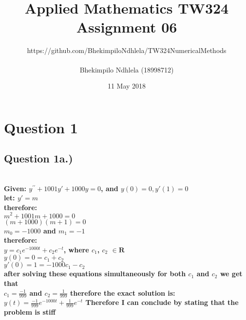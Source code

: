 \documentclass{article}
\title{Applied Mathematics TW324 Assignment 06}
\author{https://github.com/BhekimpiloNdhlela/TW324NumericalMethods \\ \\ Bhekimpilo Ndhlela (18998712)}
\date{11 May 2018}
\begin{document}
\maketitle
\pagebreak

\section*{Question 1}
\subsection*{Question 1a.)}
\textbf{\\Given: $y^{\prime \prime} +1001y\prime +1000y = 0$, and  $y(0) = 0, y\prime(1) = 0$ \\let: $y\prime = m$\\ therefore:\\ $m^2 + 1001m + 1000 = 0$\\ $(m + 1000)(m + 1) = 0$\\ $m_0 = -1000$ and $m_1 = -1$\\ therefore:\\ $y = c_1 e^{-1000t} + c_2e^{-t}$,   where $c_1$, $c_2$ $\in \mathbf{R}$\\ $y(0) = 0 = c_1 + c_2$\\ $y\prime(0) = 1 = -1000c_1 - c_2$\\
after solving these equations simultaneously for both $c_1$ and $c_2$ we get that \\
$c_1 =\frac{-1}{999}$ and $c_2 = \frac{1}{999}$ therefore the exact solution is:\\
$y(t) = \frac{-1}{999}e^{-1000t} + \frac{1}{999}e^{-t}$ Therefore I can conclude by stating that the problem is stiff}
\end{document}

